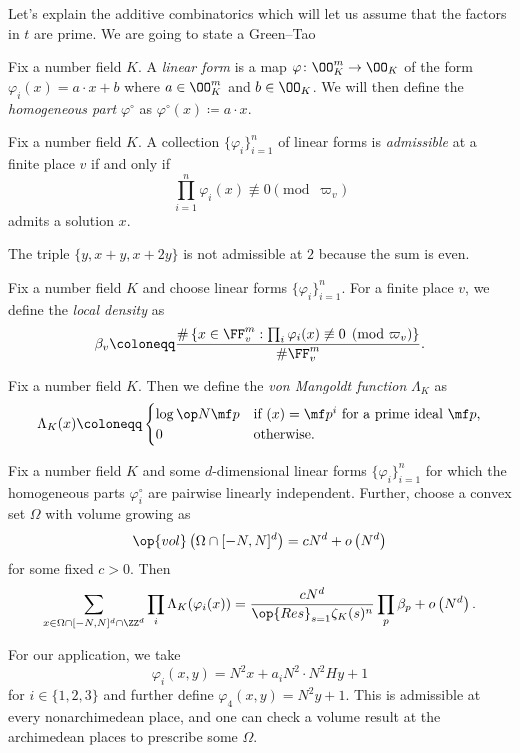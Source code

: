 \documentclass[../notes.tex]{subfiles}
\begin{document}
Let's explain the additive combinatorics which will let us assume that the factors in $t$ are prime. We are going to state a Green--Tao
\begin{definition}[admissible]
	Fix a number field $K$. A \textit{linear form} is a map $\varphi\colon\OO_K^m\to\OO_K$ of the form $\varphi_i(x)=a\cdot x+b$ where $a\in\OO_K^{m}$ and $b\in\OO_K$. We will then define the \textit{homogeneous part} $\varphi^\circ$ as $\varphi^\circ(x)\coloneqq a\cdot x$.
\end{definition}
\begin{definition}[admissible]
	Fix a number field $K$. A collection $\{\varphi_i\}_{i=1}^n$ of linear forms is \textit{admissible} at a finite place $v$ if and only if
	\[\prod_{i=1}^n\varphi_i(x)\not\equiv0\pmod{\varpi_v}\]
	admits a solution $x$.
\end{definition}
\begin{example}
	The triple $\{y,x+y,x+2y\}$ is not admissible at $2$ because the sum is even.
\end{example}
\begin{definition}
	Fix a number field $K$ and choose linear forms $\{\varphi_i\}_{i=1}^n$. For a finite place $v$, we define the \textit{local density} as
	\[\beta_v\coloneqq\frac{\#\left\{x\in\FF_v^m:\prod_i\varphi_i(x)\not\equiv0\pmod{\varpi_v}\right\}}{\#\FF_v^m}.\]
\end{definition}
\begin{definition}
	Fix a number field $K$. Then we define the \textit{von Mangoldt function} $\Lambda_K$ as
	\[\Lambda_K(x)\coloneqq\begin{cases}
		\log\op N\mf p & \text{if }(x)=\mf p^i\text{ for a prime ideal }\mf p, \\
		0 & \text{otherwise}.
	\end{cases}\]
\end{definition}
\begin{theorem}[Kai]
	Fix a number field $K$ and some $d$-dimensional linear forms $\{\varphi_i\}_{i=1}^n$ for which the homogeneous parts $\varphi_i^\circ$ are pairwise linearly independent. Further, choose a convex set $\Omega$ with volume growing as
	\[\op{vol}\left(\Omega\cap[-N,N]^d\right)=cN^d+o\left(N^d\right)\]
	for some fixed $c>0$. Then
	\[\sum_{x\in\Omega\cap[-N,N]^d\cap\ZZ^d}\prod_i\Lambda_K(\varphi_i(x))=\frac{cN^d}{\op{Res}_{s=1}\zeta_K(s)^n}\prod_p\beta_p+o\left(N^d\right).\]
\end{theorem}
For our application, we take
\[\varphi_i(x,y)=N^2x+a_iN^2\cdot N^2Hy+1\]
for $i\in\{1,2,3\}$ and further define $\varphi_4(x,y)=N^2y+1$. This is admissible at every nonarchimedean place, and one can check a volume result at the archimedean places to prescribe some $\Omega$.
\end{document}
